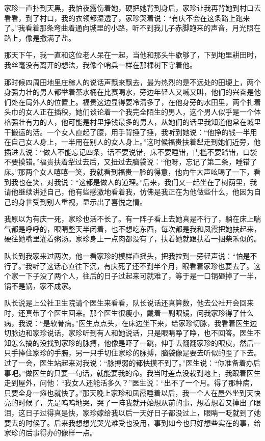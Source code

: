 \documentclass[12pt,UTF8]{ctexbook}
\begin{document}
家珍一直扑到天黑，我怕夜露伤着她，硬把她背到身后，家珍让我再背她到村口去看看，到了村口，我的衣领都湿透了，家珍哭着说：“有庆不会在这条路上跑来了。”我看着那条弯曲着通向城里的小路，听不到我儿子赤脚跑来的声音，月光照在路上，像是撒满了盐。

那天下午，我一直和这位老人呆在一起，当他和那头牛歇够了，下到地里耕田时，我丝毫没有离开的想法，我像个哨兵一样在那棵树下守着他。

那时候四周田地里庄稼人的说话声飘来飘去，最为热烈的是不远处的田埂上，两个身强力壮的男人都举着茶水桶在比赛喝水，旁边年轻人又喊又叫，他们的兴奋是他们处在局外人的位置上。福贵这边显得要冷清多了，在他身旁的水田里，两个扎着头巾的女人正在插秧，她们谈论着一个我完全陌生的男人，这个男人似乎是一个体格强壮有力的人，他可能是村里挣钱最多的男人，从她们的话里我知道他常在城里干搬运的活。一个女人直起了腰，用手背捶了捶，我听到她说：“他挣的钱一半用在自己女人身上，一半用在别人的女人身上。”这时候福贵扶着犁走到她们近旁，他插进去说：“做人不能忘记四条，话不要说错，床不要睡错，门槛不要踏错，口袋不要摸错。”福贵扶着犁过去后，又扭过去脑袋说：“他呀，忘记了第二条，睡错了床。”那两个女人嘻嘻一笑，我就看到福贵一脸的得意，他向牛大声吆喝了一下，看到我也在笑，对我说：“这都是做人的道理。”后来，我们又一起坐在了树荫里，我请他继续讲述自己，他有些感激地看着我，仿佛是我正在为他做些什么，他因为自己的身世受到别人重视，显示出了喜悦之情。

我原以为有庆一死，家珍也活不长了。有一阵子看上去她真是不行了，躺在床上喘气都是呼呼的，眼睛整天半闭着，也不想吃东西，每次都是我和凤霞把她扶起来，硬往她嘴里灌着粥汤。家珍身上一点肉都没有了，扶着她就跟扶着一捆柴禾似的。

队长到我家来过两次，他一看家珍的模样直摇头，把我拉到一旁轻声说：“怕是不行了。”我听了这话心直往下沉，有庆死了还不到半个月，眼看着家珍也要去了。这个家一下子没了两个人，往后的日子过起来可就难了，等于是一口锅砸掉了一半，锅不是锅，家不成家。

队长说是上公社卫生院请个医生来看看，队长说话还真算数，他去公社开会回来时，还真带了个医生回来。那个医生很瘦小，戴着一副眼镜，问我家珍得了什么病，我说：“是软骨病。”医生点点头，在床边坐下来，给家珍切脉，我看着医生边切脉边和家珍说话，家珍听到有人和她说话，只是眼睛睁了睁，也不回答。医生不知怎么搞的没找到家珍的脉搏，他像是吓了一跳，伸手去翻翻家珍的眼皮，然后一只手捧住家珍的手腕，另一只手切住家珍的脉搏，脑袋像是要去听似的歪了下去。过了一会，医生站起来对我说：“脉搏弱的都快摸不到了。”医生说：“你准备着办后事吧。”做医生的只要一句话，就能要我的命。我当时差点没栽到地上，我跟着医生走到屋外，问他：“我女人还能活多久？”医生说：“出不了一个月。得了那种病，只要全身一瘫也就快了。”那天晚上家珍和凤霞睡着以后，我一个人在屋外坐到天快亮的时候了，先是呜呜地哭，哭了一阵我就开始想从前的事，想着想着又掉出了眼泪，这日子过得真是快，家珍嫁给我以后一天好日子都没过上，眼睛一眨就到了她要去的时候了。后来我想想光哭光难受也没用，事到如今也只好想些实在的事，给家珍的后事得办的像样一点。
\end{document}
